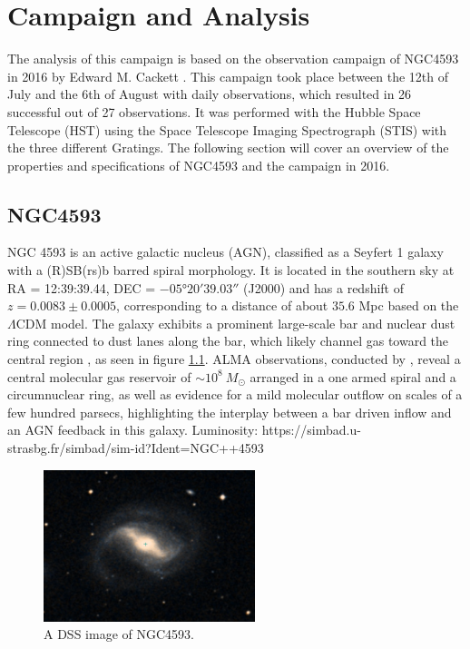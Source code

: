 \chapter{Campaign and Analysis}
\label{campaign_and_analysis}
The analysis of this campaign is based on the observation campaign of NGC4593 in 2016 by Edward M. Cackett \parencite{cackett2018accretion}. This campaign took place between the 12th of July and the 6th of August with daily observations, which resulted in 26 successful out of 27 observations. It was performed with the Hubble Space Telescope (HST) using the Space Telescope Imaging Spectrograph (STIS) with the three different Gratings. The following section will cover an overview of the properties and specifications of NGC4593 and the campaign in 2016.

\section{NGC4593}
\label{NGC4593}

NGC 4593 is an active galactic nucleus (AGN), classified as a Seyfert 1 galaxy with a \mbox{(R)SB(rs)b} barred spiral morphology. 
It is located in the southern sky at RA = 12:39:39.44, DEC = $-05$°$ 20' 39.03''$ (J2000) and has a redshift of $z = 0.0083 \pm 0.0005$, corresponding to a distance of about $35.6$ Mpc \parencite{simbaNGC4593} based on the $\Lambda$CDM model. 
The galaxy exhibits a prominent large-scale bar and nuclear dust ring connected to dust lanes along the bar, which likely channel gas toward the central region \parencite{mulchaey1997structure}, as seen in figure \ref{fig:NGC4593}. ALMA observations, conducted by \parencite{garcia2019alma}, reveal a central molecular gas reservoir of $\sim 10^8 \ M_\odot$ arranged in a one armed spiral and a circumnuclear ring, as well as evidence for a mild molecular outflow on scales of a few hundred parsecs, highlighting the interplay between a bar driven inflow and an AGN feedback in this galaxy. Luminosity: https://simbad.u-strasbg.fr/simbad/sim-id?Ident=NGC++4593

\begin{figure}[!ht]
	\centering
	\includegraphics[width=0.55\textwidth]{pictures/Chapter3/NGC4593.PNG}
	\caption{A DSS image of NGC4593.}
	\label{fig:NGC4593}
\end{figure}

